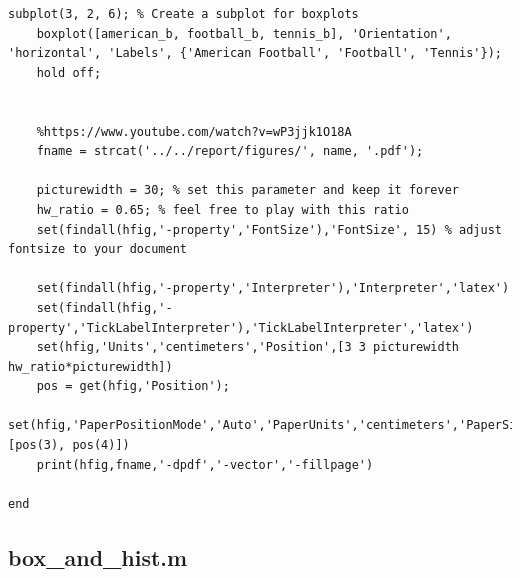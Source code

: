 \documentclass[conference]{IEEEtran}
\begin{document}
\begin{lstlisting}[style=Matlab-editor, basicstyle=\scriptsize]
    subplot(3, 2, 6); % Create a subplot for boxplots
    boxplot([american_b, football_b, tennis_b], 'Orientation', 'horizontal', 'Labels', {'American Football', 'Football', 'Tennis'});
    hold off;


    %https://www.youtube.com/watch?v=wP3jjk1O18A
    fname = strcat('../../report/figures/', name, '.pdf');

    picturewidth = 30; % set this parameter and keep it forever
    hw_ratio = 0.65; % feel free to play with this ratio
    set(findall(hfig,'-property','FontSize'),'FontSize', 15) % adjust fontsize to your document

    set(findall(hfig,'-property','Interpreter'),'Interpreter','latex') 
    set(findall(hfig,'-property','TickLabelInterpreter'),'TickLabelInterpreter','latex')
    set(hfig,'Units','centimeters','Position',[3 3 picturewidth hw_ratio*picturewidth])
    pos = get(hfig,'Position');
    set(hfig,'PaperPositionMode','Auto','PaperUnits','centimeters','PaperSize',[pos(3), pos(4)])
    print(hfig,fname,'-dpdf','-vector','-fillpage')

end
            \end{lstlisting}
        \subsection{box\_and\_hist.m}
            \begin{lstlisting}[style=Matlab-editor, basicstyle=\scriptsize]
            \end{lstlisting}
\end{document}
